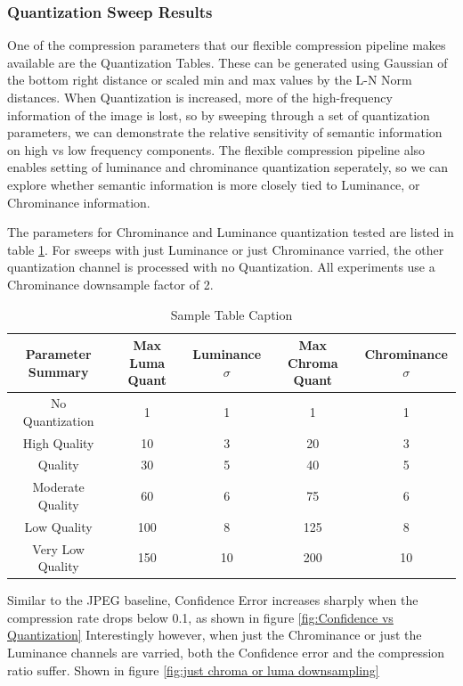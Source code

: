 \subsubsection{Quantization Sweep Results}

One of the compression parameters that our flexible compression pipeline makes available are the Quantization Tables.
These can be generated using Gaussian of the bottom right distance or scaled min and max values by the L-N Norm distances.
When Quantization is increased, more of the high-frequency information of the image is lost, so by sweeping through a set of quantization parameters, we can demonstrate the relative sensitivity of semantic information on high vs low frequency components.
The flexible compression pipeline also enables setting of luminance and chrominance quantization seperately, so we can explore whether semantic information is more closely tied to Luminance, or Chrominance information.

The parameters for Chrominance and Luminance quantization tested are listed in table \ref{tab:Quantization Parameters Table}. For sweeps with just Luminance or just Chrominance varried, the other quantization channel is processed with no Quantization.
All experiments use a Chrominance downsample factor of 2.

\begin{table}[h!]
\centering
\caption{Sample Table Caption}
\label{tab:Quantization Parameters Table}
\begin{tabular}{c|c|c|c|c}
\toprule
\textbf{Parameter Summary} & \textbf{Max Luma Quant} & \textbf{Luminance $\sigma$} & \textbf{Max Chroma Quant} & \textbf{Chrominance $\sigma$} \\
\midrule
No Quantization & 1 & 1 & 1 & 1 \\
High Quality & 10 & 3 & 20 & 3 \\
Quality & 30 & 5 & 40 & 5 \\
Moderate Quality & 60 & 6 & 75 & 6 \\
Low Quality & 100 & 8 & 125 & 8 \\
Very Low Quality & 150 & 10 & 200 & 10 \\
\bottomrule
\end{tabular}
\end{table}

Similar to the JPEG baseline, Confidence Error increases sharply when the compression rate drops below 0.1, as shown in figure \ref{fig:Confidence vs Quantization}
Interestingly however, when just the Chrominance or just the Luminance channels are varried, both the Confidence error and the compression ratio suffer. Shown in figure \ref{fig:just chroma or luma downsampling}

